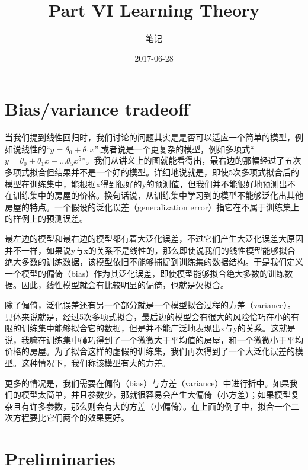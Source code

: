 \documentclass[UTF8]{ctexart}
\begin{document}
\title{Part VI Learning Theory}
\author{笔记}
\date{2017-06-28}

\maketitle

\tableofcontents

\newpage

\section{Bias/variance tradeoff}

当我们提到线性回归时，我们讨论的问题其实是是否可以适应一个简单的模型，例如说线性的“$y=\theta_{0}+\theta_{1}x$”,或者说是一个更复杂的模型，例如多项式“$y=\theta_{0}+\theta_{1}x+...\theta_{5}x^{5}$”。我们从讲义上的图就能看得出，最右边的那幅经过了五次多项式拟合但结果并不是一个好的模型。详细地说就是，即使5次多项式拟合后的模型在训练集中，能根据x得到很好的y的预测值，但我们并不能很好地预测出不在训练集中的房屋的价格。换句话说，从训练集中学习到的模型不能够泛化出其他房屋的特点。一个假设的泛化误差（generalization error）指它在不属于训练集上的样例上的预测误差。

\begin{figure}[htb]        
\end{figure}

最左边的模型和最右边的模型都有着大泛化误差，不过它们产生大泛化误差大原因并不一样，如果说y与x的关系不是线性的，那么即使说我们的线性模型能够拟合绝大多数的训练数据，该模型依旧不能够捕捉到训练集的数据结构。于是我们定义一个模型的偏倚（bias）作为其泛化误差，即使模型能够拟合绝大多数的训练数据。因此，线性模型就会有比较明显的偏倚，也就是欠拟合。

除了偏倚，泛化误差还有另一个部分就是一个模型拟合过程的方差（variance）。具体来说就是，经过5次多项式拟合，最后边的模型会有很大的风险恰巧在小的有限的训练集中能够拟合它的数据，但是并不能广泛地表现出x与y的关系。这就是说，我嘛在训练集中碰巧得到了一个微微大于平均值的房屋，和一个微微小于平均价格的房屋。为了拟合这样的虚假的训练集，我们再次得到了一个大泛化误差的模型。这种情况下，我们称该模型有大的方差。

更多的情况是，我们需要在偏倚（bias）与方差（variance）中进行折中。如果我们的模型太简单，并且参数少，那就很容易会产生大偏倚（小方差）；如果模型复杂且有许多参数，那么则会有大的方差（小偏倚）。在上面的例子中，拟合一个二次方程要比它们两个的效果更好。


\section{Preliminaries}
\end{document}
